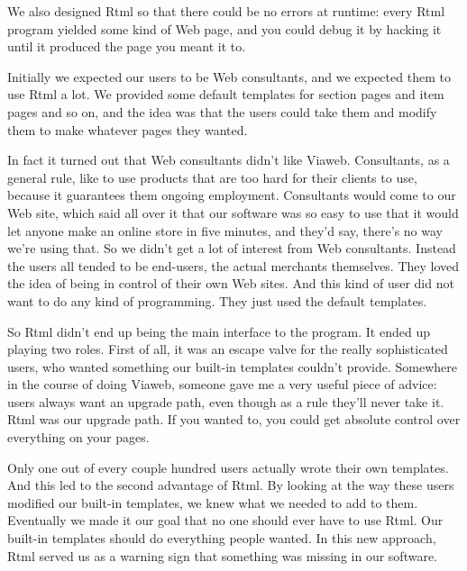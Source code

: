 \documentclass[12pt]{book}
\begin{document}
We also designed Rtml so that there could be no errors at runtime: every
Rtml program yielded some kind of Web page, and you could debug it by
hacking it until it produced the page you meant it to.

Initially we expected our users to be Web consultants, and we expected
them to use Rtml a lot. We provided some default templates for section
pages and item pages and so on, and the idea was that the users could
take them and modify them to make whatever pages they wanted.

In fact it turned out that Web consultants didn't like Viaweb.
Consultants, as a general rule, like to use products that are too hard
for their clients to use, because it guarantees them ongoing employment.
Consultants would come to our Web site, which said all over it that our
software was so easy to use that it would let anyone make an online
store in five minutes, and they'd say, there's no way we're using that.
So we didn't get a lot of interest from Web consultants. Instead the
users all tended to be end-users, the actual merchants themselves. They
loved the idea of being in control of their own Web sites. And this kind
of user did not want to do any kind of programming. They just used the
default templates.

So Rtml didn't end up being the main interface to the program. It ended
up playing two roles. First of all, it was an escape valve for the
really sophisticated users, who wanted something our built-in templates
couldn't provide. Somewhere in the course of doing Viaweb, someone gave
me a very useful piece of advice: users always want an upgrade path,
even though as a rule they'll never take it. Rtml was our upgrade path.
If you wanted to, you could get absolute control over everything on your
pages.

Only one out of every couple hundred users actually wrote their own
templates. And this led to the second advantage of Rtml. By looking at
the way these users modified our built-in templates, we knew what we
needed to add to them. Eventually we made it our goal that no one should
ever have to use Rtml. Our built-in templates should do everything
people wanted. In this new approach, Rtml served us as a warning sign
that something was missing in our software.
\end{document}
